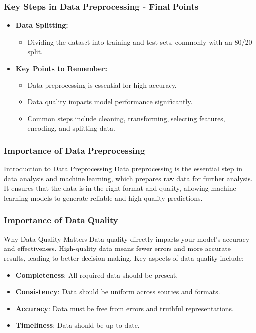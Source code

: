 \documentclass[aspectratio=169]{beamer}
\begin{document}
\begin{frame}[fragile]
    \frametitle{Key Steps in Data Preprocessing - Final Points}
    \begin{itemize}
        \item \textbf{Data Splitting:}
            \begin{itemize}
                \item Dividing the dataset into training and test sets, commonly with an 80/20 split.
            \end{itemize}
        \item \textbf{Key Points to Remember:}
            \begin{itemize}
                \item Data preprocessing is essential for high accuracy.
                \item Data quality impacts model performance significantly.
                \item Common steps include cleaning, transforming, selecting features, encoding, and splitting data.
            \end{itemize}
    \end{itemize}
\end{frame}

\begin{frame}[fragile]
    \frametitle{Importance of Data Preprocessing}
    \begin{block}{Introduction to Data Preprocessing}
        Data preprocessing is the essential step in data analysis and machine learning, which prepares raw data for further analysis. It ensures that the data is in the right format and quality, allowing machine learning models to generate reliable and high-quality predictions.
    \end{block}
\end{frame}

\begin{frame}[fragile]
    \frametitle{Importance of Data Quality}
    \begin{block}{Why Data Quality Matters}
        Data quality directly impacts your model’s accuracy and effectiveness. High-quality data means fewer errors and more accurate results, leading to better decision-making. Key aspects of data quality include:
    \end{block}
    
    \begin{itemize}
        \item \textbf{Completeness}: All required data should be present.
        \item \textbf{Consistency}: Data should be uniform across sources and formats.
        \item \textbf{Accuracy}: Data must be free from errors and truthful representations.
        \item \textbf{Timeliness}: Data should be up-to-date.
    \end{itemize}
\end{frame}
\end{document}
